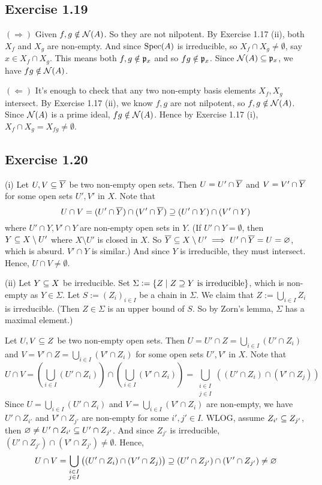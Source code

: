 \documentclass[../A&M.tex]{subfiles}
\begin{document}
\subsection*{Exercise 1.19}

$(\Rightarrow)$ Given $f,g\notin\mathcal{N}(A)$. So they are not nilpotent. By Exercise 1.17 (ii), both $X_f$ and $X_g$ are non-empty. And since $\operatorname{Spec}(A)$ is irreducible, so $X_f \cap X_g \neq \emptyset$, say $x\in X_f \cap X_g$. This means both $f,g\notin\mathfrak{p}_x$ and so $fg\notin\mathfrak{p}_x$. Since $\mathcal{N}(A)\subseteq \mathfrak{p}_x$, we have $fg\notin\mathcal{N}(A)$.

$(\Leftarrow)$ It's enough to check that any two non-empty basis elements $X_f,X_g$ intersect. By Exercise 1.17 (ii), we know $f,g$ are not nilpotent, so $f,g\notin\mathcal{N}(A)$. Since $\mathcal{N}(A)$ is a prime ideal, $fg\notin\mathcal{N}(A)$. Hence by Exercise 1.17 (i), $X_f \cap X_g = X_{fg}\neq\emptyset$.

\subsection*{Exercise 1.20}

(i) Let $U,V \subseteq \overline{Y}$ be two non-empty open sets. Then $U = U' \cap \overline{Y}$ and $V = V' \cap \overline{Y}$ for some open sets $U',V'$ in $X$. Note that
$$
U \cap V = (U' \cap \overline{Y}) \cap (V' \cap \overline{Y}) \supseteq (U' \cap Y) \cap (V' \cap Y)
$$
where $U' \cap Y, V' \cap Y$ are non-empty open sets in $Y$. (If $U' \cap Y = \emptyset$, then $Y \subseteq X \setminus U'$ where $X \setminus U'$ is closed in $X$. So $\overline{Y} \subseteq X \setminus U' \implies U' \cap \overline{Y} = U = \varnothing$, which is absurd. $V' \cap Y$ is similar.) And since $Y$ is irreducible, they must intersect. Hence, $U \cap V \neq \emptyset$.

(ii) Let $Y \subseteq X$ be irreducible. Set $\Sigma:=\{ Z \mid Z \supseteq Y \text{ is irreducible}\}$, which is non-empty as $Y\in\Sigma$. Let $S:=(Z_i)_{i\in I}$ be a chain in $\Sigma$. We claim that $Z := \bigcup_{i\in I} Z_i$ is irreducible. (Then $Z\in\Sigma$ is an upper bound of $S$. So by Zorn's lemma, $\Sigma$ has a maximal element.)

Let $U,V \subseteq Z$ be two non-empty open sets. Then $U = U' \cap Z = \bigcup_{i\in I} (U' \cap Z_i)$ and $V = V' \cap Z = \bigcup_{i\in I} (V' \cap Z_i)$ for some open sets $U',V'$ in $X$. Note that
$$
U \cap V
= \left( \bigcup_{i\in I} (U' \cap Z_i) \right) \cap \left( \bigcup_{i\in I} (V' \cap Z_i) \right)
= \bigcup_{\substack{ i\in I \\ j\in I }} \left( (U' \cap Z_i) \cap (V' \cap Z_j) \right)
$$
Since $U = \bigcup_{i\in I} (U' \cap Z_i)$ and $V = \bigcup_{i\in I} (V' \cap Z_i)$ are non-empty, we have $U' \cap Z_{i'}$ and $V' \cap Z_{j'}$ are non-empty for some $i',j' \in I$. WLOG, assume $Z_{i'} \subseteq Z_{j'}$, then $\varnothing \neq U' \cap Z_{i'} \subseteq U' \cap Z_{j'}$. And since $Z_{j'}$ is irreducible, $(U' \cap Z_{j'}) \cap (V' \cap Z_{j'}) \neq \emptyset$. Hence,
$$
U \cap V
= \bigcup_{\substack{ i\in I \\ j\in I }} \left( (U' \cap Z_i) \cap (V' \cap Z_j) \right)
\supseteq (U' \cap Z_{j'}) \cap (V' \cap Z_{j'})
\neq \varnothing
$$
\end{document}
